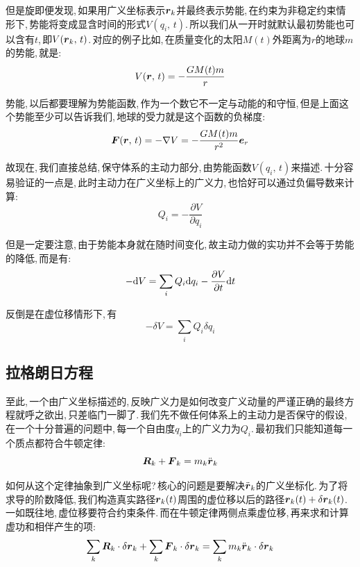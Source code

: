 但是旋即便发现,\,如果用广义坐标表示$\boldsymbol{r}_k$并最终表示势能,\,在约束为非稳定约束情形下,\,势能将变成显含时间的形式$V(q_i,\,t)$.\,所以我们从一开时就默认最初势能也可以含有$t$,\,即$V(\boldsymbol{r}_k,\,t)$.\,对应的例子比如,\,在质量变化的太阳$M(t)$外距离为$r$的地球$m$的势能,\,就是:
\[V(\boldsymbol{r},\,t)=-\frac{GM(t)m}{r}\]

势能,\,以后都要理解为势能函数,\,作为一个数它不一定与动能的和守恒,\,但是上面这个势能至少可以告诉我们,\,地球的受力就是这个函数的负梯度:
\[\boldsymbol{F}(\boldsymbol{r},\,t)=-\nabla V=-\frac{GM(t)m}{r^2}\boldsymbol{e}_r\]

故现在,\,我们直接总结,\,保守体系的主动力部分,\,由势能函数$V(q_i,\,t)$来描述.\,十分容易验证的一点是,\,此时主动力在广义坐标上的广义力,\,也恰好可以通过负偏导数来计算:
\[Q_i=-\frac{\partial V}{\partial q_i}\]

但是一定要注意,\,由于势能本身就在随时间变化,\,故主动力做的实功并不会等于势能的降低,\,而是有:
\[-\textrm{d} V=\sum_i Q_i\textrm{d} q_i -\frac{\partial V}{\partial t}\textrm{d} t\]

反倒是在虚位移情形下,\,有
\[-\delta V=\sum_i Q_i\delta q_i\]


\subsection{拉格朗日方程}

至此,\,一个由广义坐标描述的,\,反映广义力是如何改变广义动量的严谨正确的最终方程就呼之欲出,\,只差临门一脚了.\,我们先不做任何体系上的主动力是否保守的假设,\,在一个十分普遍的问题中,\,每一个自由度$q_i$上的广义力为$Q_i$.\,最初我们只能知道每一个质点都符合牛顿定律:
\[\boldsymbol{R}_k+\boldsymbol{F}_k=m_k \ddot{\boldsymbol{r}}_k\]

如何从这个定律抽象到广义坐标呢?\,核心的问题是要解决$\ddot{\boldsymbol{r}}_k$的广义坐标化.\,为了将求导的阶数降低,\,我们构造真实路径$\boldsymbol{r}_k(t)$周围的虚位移以后的路径$\boldsymbol{r}_k(t)+\delta \boldsymbol{r}_k(t)$.\,一如既往地,\,虚位移要符合约束条件.\,而在牛顿定律两侧点乘虚位移,\,再来求和计算虚功和相伴产生的项:
\[\sum_k\boldsymbol{R}_k\cdot \delta \boldsymbol{r}_k+\sum_k\boldsymbol{F}_k\cdot \delta \boldsymbol{r}_k=\sum_k m_k \ddot{\boldsymbol{r}}_k\cdot \delta \boldsymbol{r}_k\]

